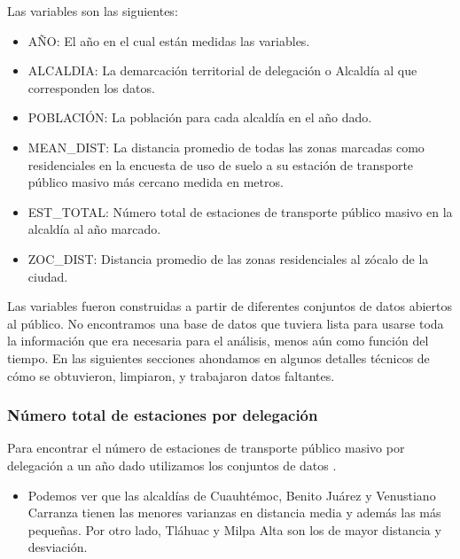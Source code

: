 \documentclass[
]{article}
\providecommand{\tightlist}{%
  \setlength{\itemsep}{0pt}\setlength{\parskip}{0pt}}
\begin{document}
Las variables son las siguientes:

\begin{itemize}
\tightlist
\item
  AÑO: El año en el cual están medidas las variables.
\item
  ALCALDIA: La demarcación territorial de delegación o Alcaldía al que
  corresponden los datos.
\item
  POBLACIÓN: La población para cada alcaldía en el año dado.
\item
  MEAN\_DIST: La distancia promedio de todas las zonas marcadas como
  residenciales en la encuesta de uso de suelo a su estación de
  transporte público masivo más cercano medida en metros.
\item
  EST\_TOTAL: Número total de estaciones de transporte público masivo en
  la alcaldía al año marcado.
\item
  ZOC\_DIST: Distancia promedio de las zonas residenciales al zócalo de
  la ciudad.
\end{itemize}

Las variables fueron construidas a partir de diferentes conjuntos de
datos abiertos al público. No encontramos una base de datos que tuviera
lista para usarse toda la información que era necesaria para el
análisis, menos aún como función del tiempo. En las siguientes secciones
ahondamos en algunos detalles técnicos de cómo se obtuvieron, limpiaron,
y trabajaron datos faltantes.

\hypertarget{nuxfamero-total-de-estaciones-por-delegaciuxf3n}{%
\subsubsection{Número total de estaciones por
delegación}\label{nuxfamero-total-de-estaciones-por-delegaciuxf3n}}

Para encontrar el número de estaciones de transporte público masivo por
delegación a un año dado utilizamos los conjuntos de datos
\cite{metrobus}.

\begin{itemize}
\tightlist
\item
  Podemos ver que las alcaldías de Cuauhtémoc, Benito Juárez y
  Venustiano Carranza tienen las menores varianzas en distancia media y
  además las más pequeñas. Por otro lado, Tláhuac y Milpa Alta son los
  de mayor distancia y desviación.
\end{itemize}
\end{document}

